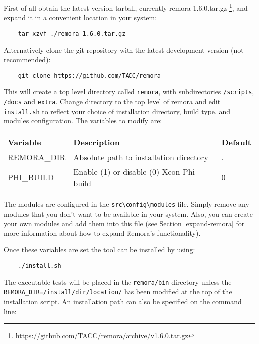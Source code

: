 \documentclass[10pt,a4paper]{report}
\begin{document}
First of all obtain the latest version tarball, currently remora-1.6.0.tar.gz \footnote{\href{https://github.com/TACC/remora/archive/v1.6.0.tar.gz}{https://github.com/TACC/remora/archive/v1.6.0.tar.gz}}, and expand it in a convenient location in your system:

\begin{verbatim}
    tar xzvf ./remora-1.6.0.tar.gz
\end{verbatim}

Alternatively clone the git repository with the latest development version (not recommended):

\begin{verbatim}
    git clone https://github.com/TACC/remora
\end{verbatim}

This will create a top level directory called \verb+remora+, with subdirectories \verb+/scripts+, \verb+/docs+ and \verb+extra+. Change directory to the top level of remora and edit \verb+install.sh+ to reflect your choice of installation directory, build type, and modules configuration. The variables to modify are:

\begin{table}[h]
\centering
\label{tab:env}
\begin{tabular}{|l|l|l|}
\hline
\bf{Variable}	& \bf{Description}                          & \bf{Default}\\\hline
REMORA\_DIR     & Absolute path to installation directory   & . \\\hline
PHI\_BUILD      & Enable (1) or disable (0) Xeon Phi build  & 0 \\\hline
\end{tabular}
\end{table}

The modules are configured in the \verb+src\config\modules+ file. Simply remove any modules that you don't want to be available in your system. Also, you can create your own modules and add them into this file (see Section \ref{expand-remora} for more information about how to expand Remora's functionality).

Once these variables are set the tool can be installed by using:

\begin{verbatim}
    ./install.sh
\end{verbatim}

The executable tests will be placed in the \verb+remora/bin+ directory unless the \verb+REMORA_DIR=/install/dir/location/+ has been modified at the top of the installation script. An installation path can also be specified on the command line:
\end{document}
